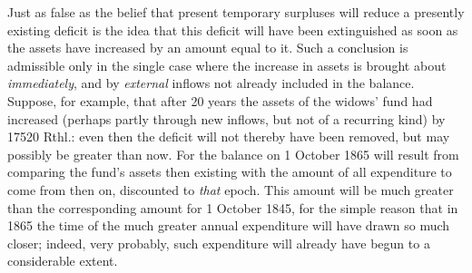 Just as false as the belief that present temporary surpluses will reduce a presently existing deficit is the idea that this deficit will have been extinguished as soon as the assets have increased by an amount equal to it. Such a conclusion is admissible only in the single case where the increase in assets is brought about \textit{immediately}, and by \textit{external} inflows not already included in the balance. Suppose, for example, that after 20 years the assets of the widows' fund had increased (perhaps partly through new inflows, but not of a recurring kind) by 17520 Rthl.: even then the deficit will not thereby have been removed, but may possibly be greater than now. For the balance on 1 October 1865 will result from comparing the fund's assets then existing with the amount of all expenditure to come from then on, discounted to \textit{that} epoch. This amount will be much greater than the corresponding amount for 1 October 1845, for the simple reason that in 1865 the time of the much greater annual expenditure will have drawn so much closer; indeed, very probably, such expenditure will already have begun to a considerable extent.

